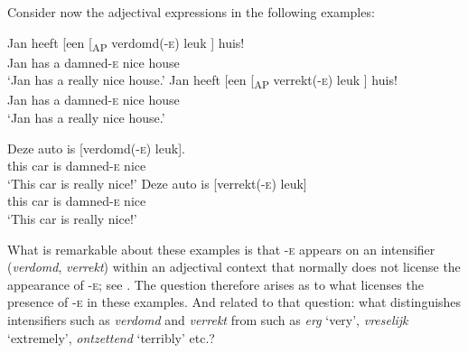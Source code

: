 \documentclass[output=paper]{langsci/langscibook}
\begin{document}
Consider now the adjectival expressions in the following examples:

\ea%
    \label{ex:key:18.58}
	\ea
	\gll  Jan  heeft    [een    [\textsubscript{AP}  verdomd(\textsc{-e})  leuk ]    huis!\\
		Jan    has        a         {}       damned-\textsc{e}      nice {}   house\\
	\glt \enquote*{Jan has a really nice house.}
	\ex
	\gll  Jan  heeft  [een    [\textsubscript{AP}  verrekt(\textsc{-e})  leuk ]  huis!\\
    Jan    has      a      {}          damned-\textsc{e}    nice {} house\\
	\glt \enquote*{Jan has a really nice house.}
	\z
\z

\ea%
    \label{ex:key:18.59}
	\ea
	\gll Deze    auto    is    [verdomd(\textsc{-e})  leuk].\\
		this      car      is    damned-\textsc{e}        nice\\
	\glt \enquote*{This car is really nice!}
	\ex
	\gll Deze    auto    is    [verrekt(\textsc{-e})    leuk]\\
		this      car      is    damned-\textsc{e}      nice\\
	\glt \enquote*{This car is really nice!}
	\z
\z

What is remarkable about these examples is that \textsc{-e} appears on an
intensifier (\emph{verdomd}, \emph{verrekt}) within an adjectival context that
normally does not license the appearance of \textsc{-e}; see .
The question therefore arises as to what licenses the presence of \textsc{-e}
in these examples. And related to that question: what distinguishes
intensifiers such as \emph{verdomd} and \emph{verrekt} from  such
as \emph{erg} \enquote*{very}, \emph{vreselijk} \enquote*{extremely},
\emph{ontzettend} \enquote*{terribly} etc.?\largerpage[-1]
\end{document}
